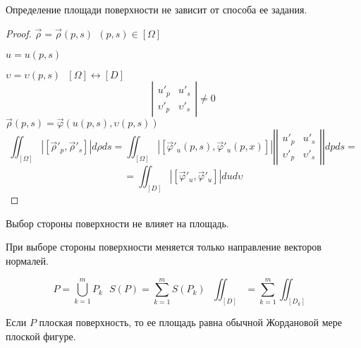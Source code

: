 \begin{theorem}
  Определение площади поверхности не зависит от способа ее задания.
\end{theorem}

\begin{proof}
  $\vec \rho = \vec \rho(p,s) ~~ (p,s) \in [\Omega]$

  $u = u(p,s)$

  $\upsilon = \upsilon(p, s) ~~~ [\Omega] \leftrightarrow [D]$
  $$
  \left|
  \begin{array}{cc}
    u'_p & u'_s \\
    \upsilon'_p & \upsilon'_s
  \end{array}
  \right| \not = 0
  $$
  $\vec \rho(p,s) = \vec \varphi(u(p,s), \upsilon(p,s))$
  $$
  \iint_{[\Omega]}|[\vec \rho'_p, \vec \rho'_s]| d\rho ds =
  \iint_{[\Omega]}|[\vec \varphi'_u(p,s), \vec \varphi'_u(p,x)]|
  \left| \left|
  \begin{array}{cc}
    u'_p & u'_s \\
    \upsilon'_p & \upsilon'_s
  \end{array}
  \right| \right|dp ds =
  $$
  $$
  = \iint_{[D]} |[\vec \varphi'_u, \vec \varphi'_u]| du d\upsilon
  $$
\end{proof}

\begin{theorem}
  Выбор стороны поверхности не влияет на площадь.

  При выборе стороны поверхности меняется только направление векторов нормалей.
\end{theorem}

\begin{theorem}
  $$
  P = \bigcup_{k=1}^m P_k ~~~ S(P) = \sum_{k=1}^m S(P_k) ~~~
  \iint_{[D]} = \sum_{k=1}^m \iint_{[D_k]}
  $$
\end{theorem}

\begin{theorem}
  Если $P$ плоская поверхность, то ее площадь равна обычной Жордановой мере
  плоской фигуре.
\end{theorem}


